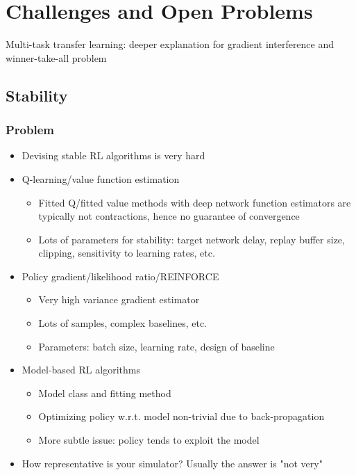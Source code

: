 \chapter{Challenges and Open Problems}

Multi-task transfer learning: deeper explanation for gradient interference and winner-take-all problem

\section{Stability}
\subsection{Problem}
\begin{itemize}
	\item Devising stable RL algorithms is very hard
	\item Q-learning/value function estimation
	\begin{itemize}
		\item Fitted Q/fitted value methods with deep network function estimators are typically not contractions, hence no guarantee of convergence
		\item Lots of parameters for stability: target network delay, replay buffer size, clipping, sensitivity to learning rates, etc.
	\end{itemize}	
	\item Policy gradient/likelihood ratio/REINFORCE
	\begin{itemize}
		\item Very high variance gradient estimator
		\item Lots of samples, complex baselines, etc.
		\item Parameters: batch size, learning rate, design of baseline
	\end{itemize}	
	\item Model-based RL algorithms
	\begin{itemize}
		\item Model class and fitting method
		\item Optimizing policy w.r.t. model non-trivial due to back-propagation
		\item More subtle issue: policy tends to exploit the model
	\end{itemize}
	\item How representative is your simulator? Usually the answer is "not very"
\end{itemize}
